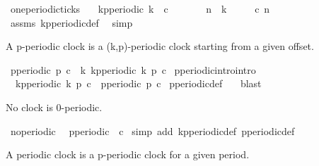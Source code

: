 \begin{isabellebody}
\ one{\isacharunderscore}periodic{\isacharunderscore}ticks{\isacharcolon}\isanewline
\ \ \ {\isacartoucheopen}kp{\isacharunderscore}periodic\ k\ {}\ c{\isacartoucheclose}\isanewline
\ \ \ \ \ \ \ {\isacartoucheopen}n\ {\isasymge}\ k{\isacartoucheclose}\isanewline
\ \ \ \ \ {\isacartoucheopen}c\ n{\isacartoucheclose}\isanewline
%
\isadelimproof
%
\endisadelimproof
%
\isatagproof
{}\isamarkupfalse%
\ assms\ kp{\isacharunderscore}periodic{\isacharunderscore}def\ \isamarkupfalse%
\ simp%
\endisatagproof
{\isafoldproof}%
%
\isadelimproof
%
\endisadelimproof
%
\begin{isamarkuptext}%
A p-periodic clock is a (k,p)-periodic clock starting from a given offset.%
\end{isamarkuptext}\isamarkuptrue%
\isamarkupfalse%
\ {\isacartoucheopen}p{\isacharunderscore}periodic\ p\ c\ {\isasymequiv}\ {\isacharparenleft}{\isasymexists}k{\isachardot}\ kp{\isacharunderscore}periodic\ k\ p\ c{\isacharparenright}{\isacartoucheclose}\isanewline
\isanewline
{}\isamarkupfalse%
\ p{\isacharunderscore}periodic{\isacharunderscore}intro{\isacharbrackleft}intro{\isacharbrackright}{\isacharcolon}\isanewline
\ \ {\isacartoucheopen}kp{\isacharunderscore}periodic\ k\ p\ c\ {\isasymLongrightarrow}\ p{\isacharunderscore}periodic\ p\ c{\isacartoucheclose}\isanewline
%
\isadelimproof
%
\endisadelimproof
%
\isatagproof
{}\isamarkupfalse%
\ p{\isacharunderscore}periodic{\isacharunderscore}def\ \ \isamarkupfalse%
\ blast%
\endisatagproof
{\isafoldproof}%
%
\isadelimproof
%
\endisadelimproof
%
\begin{isamarkuptext}%
No clock is 0-periodic.%
\end{isamarkuptext}\isamarkuptrue%
\isamarkupfalse%
\ no{\isacharunderscore}{}{\isacharunderscore}periodic{\isacharcolon}\isanewline
\ \ {\isacartoucheopen}{\isasymnot}p{\isacharunderscore}periodic\ {}\ c{\isacartoucheclose}\isanewline
%
\isadelimproof
%
\endisadelimproof
%
\isatagproof
{}\isamarkupfalse%
\ {\isacharparenleft}simp\ add{\isacharcolon}\ kp{\isacharunderscore}periodic{\isacharunderscore}def\ p{\isacharunderscore}periodic{\isacharunderscore}def{\isacharparenright}%
\endisatagproof
{\isafoldproof}%
%
\isadelimproof
%
\endisadelimproof
%
\begin{isamarkuptext}%
A periodic clock is a p-periodic clock for a given period.%
\end{isamarkuptext}\isamarkuptrue%

\end{isabellebody}
